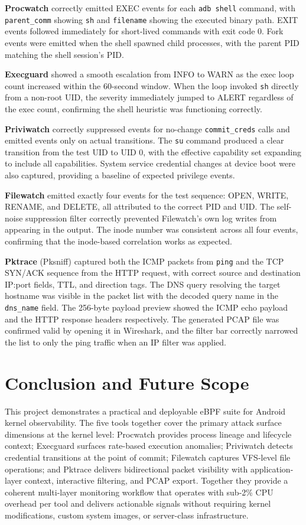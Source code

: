 \documentclass{mnitjaipur}
\begin{document}
\textbf{Procwatch} correctly emitted EXEC events for each \texttt{adb shell} command, with \texttt{parent\_comm} showing \texttt{sh} and \texttt{filename} showing the executed binary path. EXIT events followed immediately for short-lived commands with exit code 0. Fork events were emitted when the shell spawned child processes, with the parent PID matching the shell session's PID.

\textbf{Execguard} showed a smooth escalation from INFO to WARN as the exec loop count increased within the 60-second window. When the loop invoked \texttt{sh} directly from a non-root UID, the severity immediately jumped to ALERT regardless of the exec count, confirming the shell heuristic was functioning correctly.

\textbf{Priviwatch} correctly suppressed events for no-change \texttt{commit\_creds} calls and emitted events only on actual transitions. The \texttt{su} command produced a clear transition from the test UID to UID 0, with the effective capability set expanding to include all capabilities. System service credential changes at device boot were also captured, providing a baseline of expected privilege events.

\textbf{Filewatch} emitted exactly four events for the test sequence: OPEN, WRITE, RENAME, and DELETE, all attributed to the correct PID and UID. The self-noise suppression filter correctly prevented Filewatch's own log writes from appearing in the output. The inode number was consistent across all four events, confirming that the inode-based correlation works as expected.

\textbf{Pktrace} (Pksniff) captured both the ICMP packets from \texttt{ping} and the TCP SYN/ACK sequence from the HTTP request, with correct source and destination IP:port fields, TTL, and direction tags. The DNS query resolving the target hostname was visible in the packet list with the decoded query name in the \texttt{dns\_name} field. The 256-byte payload preview showed the ICMP echo payload and the HTTP response headers respectively. The generated PCAP file was confirmed valid by opening it in Wireshark, and the filter bar correctly narrowed the list to only the ping traffic when an IP filter was applied.

\clearpage
\chapter{Conclusion and Future Scope}
This project demonstrates a practical and deployable eBPF suite for Android kernel observability. The five tools together cover the primary attack surface dimensions at the kernel level: Procwatch provides process lineage and lifecycle context; Execguard surfaces rate-based execution anomalies; Priviwatch detects credential transitions at the point of commit; Filewatch captures VFS-level file operations; and Pktrace delivers bidirectional packet visibility with application-layer context, interactive filtering, and PCAP export. Together they provide a coherent multi-layer monitoring workflow that operates with sub-2\% CPU overhead per tool and delivers actionable signals without requiring kernel modifications, custom system images, or server-class infrastructure.
\end{document}
